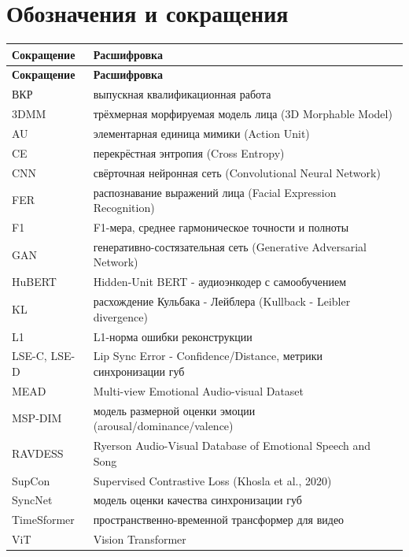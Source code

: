 \documentclass[a4paper, 12pt, oneside, openany]{article}
\begin{document}
\section{Обозначения и сокращения}

\renewcommand{\arraystretch}{1.2}
\renewcommand{\tabcolsep}{0.3cm}
\begin{longtable}{|p{3.5cm}|p{12cm}|}
\hline
\textbf{Сокращение} & \textbf{Расшифровка} \\
\hline
\endfirsthead
\hline
\textbf{Сокращение} & \textbf{Расшифровка} \\
\hline
\endhead
ВКР & выпускная квалификационная работа \\
\hline
3DMM & трёхмерная морфируемая модель лица (3D Morphable Model) \\
\hline
AU & элементарная единица мимики (Action Unit) \\
\hline
CE & перекрёстная энтропия (Cross Entropy) \\
\hline
CNN & свёрточная нейронная сеть (Convolutional Neural Network) \\
\hline
FER & распознавание выражений лица (Facial Expression Recognition) \\
\hline
F1 & F1-мера, среднее гармоническое точности и полноты \\
\hline
GAN & генеративно-состязательная сеть (Generative Adversarial Network) \\
\hline
HuBERT & Hidden-Unit BERT - аудиоэнкодер с самообучением \\
\hline
KL & расхождение Кульбака - Лейблера (Kullback - Leibler divergence) \\
\hline
L1 & L1-норма ошибки реконструкции \\
\hline
LSE-C, LSE-D & Lip Sync Error - Confidence/Distance, метрики синхронизации губ \\
\hline
MEAD & Multi-view Emotional Audio-visual Dataset \\
\hline
MSP-DIM & модель размерной оценки эмоции (arousal/dominance/valence) \\
\hline
RAVDESS & Ryerson Audio-Visual Database of Emotional Speech and Song \\
\hline
SupCon & Supervised Contrastive Loss (Khosla et al., 2020) \\
\hline
SyncNet & модель оценки качества синхронизации губ \\
\hline
TimeSformer & пространственно-временной трансформер для видео \\
\hline
ViT & Vision Transformer \\

\end{longtable}
\end{document}

